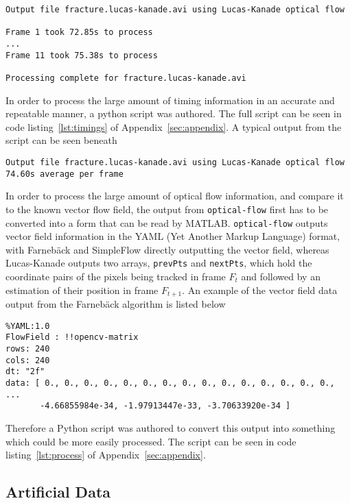 \singlespacing
\begin{verbatim}
Output file fracture.lucas-kanade.avi using Lucas-Kanade optical flow

Frame 1 took 72.85s to process
...
Frame 11 took 75.38s to process

Processing complete for fracture.lucas-kanade.avi
\end{verbatim}
\onehalfspacing

In order to process the large amount of timing information in an accurate and repeatable manner, a python script was authored. The full script can be seen in code listing~\ref{lst:timings} of Appendix~\ref{sec:appendix}. A typical output from the script can be seen beneath

\singlespacing
\begin{verbatim}
Output file fracture.lucas-kanade.avi using Lucas-Kanade optical flow
74.60s average per frame
\end{verbatim}
\onehalfspacing

In order to process the large amount of optical flow information, and compare it to the known vector flow field, the output from \verb|optical-flow| first has to be converted into a form that can be read by MATLAB. \verb|optical-flow| outputs vector field information in the YAML (Yet Another Markup Language) format, with Farnebäck and SimpleFlow directly outputting the vector field, whereas Lucas-Kanade outputs two arrays, \verb|prevPts| and \verb|nextPts|, which hold the coordinate pairs of the pixels being tracked in frame $F_t$ and followed by an estimation of their position in frame $F_{t+1}$. An example of the vector field data output from the Farnebäck algorithm is listed below

\singlespacing
\begin{verbatim}
%YAML:1.0
FlowField : !!opencv-matrix
rows: 240
cols: 240
dt: "2f"
data: [ 0., 0., 0., 0., 0., 0., 0., 0., 0., 0., 0., 0., 0., 0., 0.,
...
       -4.66855984e-34, -1.97913447e-33, -3.70633920e-34 ]
\end{verbatim}
\onehalfspacing

Therefore a Python script was authored to convert this output into something which could be more easily processed. The script can be seen in code listing~\ref{lst:process} of Appendix~\ref{sec:appendix}. 

\subsection{Artificial Data}

